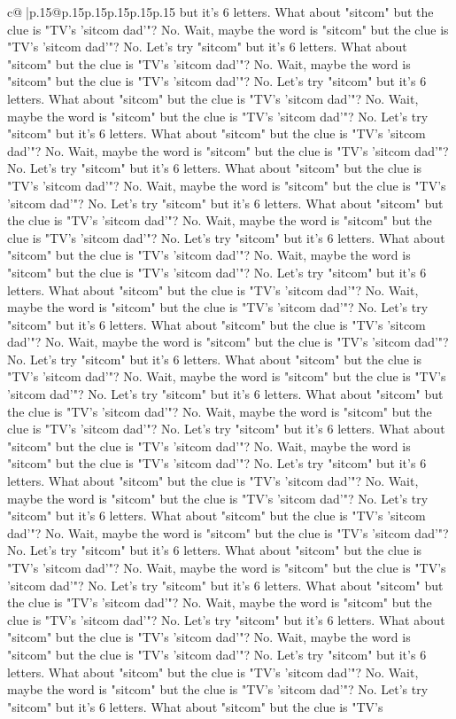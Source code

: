 \documentclass{article}
\begin{document}
{\begin{supertabular}{c@{$\;$}|p{.15\linewidth}@{}p{.15\linewidth}p{.15\linewidth}p{.15\linewidth}p{.15\linewidth}p{.15\linewidth}}
{{{but it's 6 letters. What about "sitcom" but the clue is "TV's 'sitcom dad'"? No. Wait, maybe the word is "sitcom" but the clue is "TV's 'sitcom dad'"? No. Let's try "sitcom" but it's 6 letters. What about "sitcom" but the clue is "TV's 'sitcom dad'"? No. Wait, maybe the word is "sitcom" but the clue is "TV's 'sitcom dad'"? No. Let's try "sitcom" but it's 6 letters. What about "sitcom" but the clue is "TV's 'sitcom dad'"? No. Wait, maybe the word is "sitcom" but the clue is "TV's 'sitcom dad'"? No. Let's try "sitcom" but it's 6 letters. What about "sitcom" but the clue is "TV's 'sitcom dad'"? No. Wait, maybe the word is "sitcom" but the clue is "TV's 'sitcom dad'"? No. Let's try "sitcom" but it's 6 letters. What about "sitcom" but the clue is "TV's 'sitcom dad'"? No. Wait, maybe the word is "sitcom" but the clue is "TV's 'sitcom dad'"? No. Let's try "sitcom" but it's 6 letters. What about "sitcom" but the clue is "TV's 'sitcom dad'"? No. Wait, maybe the word is "sitcom" but the clue is "TV's 'sitcom dad'"? No. Let's try "sitcom" but it's 6 letters. What about "sitcom" but the clue is "TV's 'sitcom dad'"? No. Wait, maybe the word is "sitcom" but the clue is "TV's 'sitcom dad'"? No. Let's try "sitcom" but it's 6 letters. What about "sitcom" but the clue is "TV's 'sitcom dad'"? No. Wait, maybe the word is "sitcom" but the clue is "TV's 'sitcom dad'"? No. Let's try "sitcom" but it's 6 letters. What about "sitcom" but the clue is "TV's 'sitcom dad'"? No. Wait, maybe the word is "sitcom" but the clue is "TV's 'sitcom dad'"? No. Let's try "sitcom" but it's 6 letters. What about "sitcom" but the clue is "TV's 'sitcom dad'"? No. Wait, maybe the word is "sitcom" but the clue is "TV's 'sitcom dad'"? No. Let's try "sitcom" but it's 6 letters. What about "sitcom" but the clue is "TV's 'sitcom dad'"? No. Wait, maybe the word is "sitcom" but the clue is "TV's 'sitcom dad'"? No. Let's try "sitcom" but it's 6 letters. What about "sitcom" but the clue is "TV's 'sitcom dad'"? No. Wait, maybe the word is "sitcom" but the clue is "TV's 'sitcom dad'"? No. Let's try "sitcom" but it's 6 letters. What about "sitcom" but the clue is "TV's 'sitcom dad'"? No. Wait, maybe the word is "sitcom" but the clue is "TV's 'sitcom dad'"? No. Let's try "sitcom" but it's 6 letters. What about "sitcom" but the clue is "TV's 'sitcom dad'"? No. Wait, maybe the word is "sitcom" but the clue is "TV's 'sitcom dad'"? No. Let's try "sitcom" but it's 6 letters. What about "sitcom" but the clue is "TV's 'sitcom dad'"? No. Wait, maybe the word is "sitcom" but the clue is "TV's 'sitcom dad'"? No. Let's try "sitcom" but it's 6 letters. What about "sitcom" but the clue is "TV's 'sitcom dad'"? No. Wait, maybe the word is "sitcom" but the clue is "TV's 'sitcom dad'"? No. Let's try "sitcom" but it's 6 letters. What about "sitcom" but the clue is "TV's 'sitcom dad'"? No. Wait, maybe the word is "sitcom" but the clue is "TV's 'sitcom dad'"? No. Let's try "sitcom" but it's 6 letters. What about "sitcom" but the clue is "TV's 'sitcom dad'"? No. Wait, maybe the word is "sitcom" but the clue is "TV's 'sitcom dad'"? No. Let's try "sitcom" but it's 6 letters. What about "sitcom" but the clue is "TV's }}}
\end{supertabular}}
\end{document}
